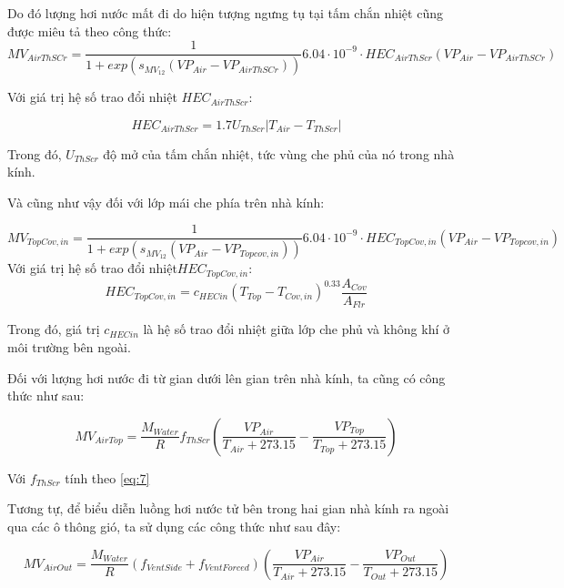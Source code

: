 \documentclass[a4paper]{article}
\begin{document}
Do đó lượng hơi nước mất đi do hiện tượng ngưng tụ tại tấm chắn nhiệt cũng được miêu tả theo công thức:
\begin{equation}\label{AirThScr}
MV_{AirThSCr} =  \frac{1}{1+exp(s_{MV_{12}}(VP_{Air}-VP_{AirThSCr}))}6.04 \cdot 10^{-9}\cdot HEC_{AirThScr} (VP_{Air}-VP_{AirThSCr})
\end{equation}

Với giá trị hệ số trao đổi nhiệt $HEC_{AirThScr}$:

\begin{equation}\label{HECAirThScr}
HEC_{AirThScr} = 1.7U_{ThScr}|T_{Air}-T_{ThScr}|
\end{equation}

Trong đó, $U_{ThScr}$ độ mở của tấm chắn nhiệt, tức vùng che phủ của nó trong nhà kính.

Và cũng như vậy đối với lớp mái che phía trên nhà kính:

\begin{equation}\label{Topcovin}
MV_{TopCov,in} =  \frac{1}{1+exp(s_{MV_{12}}(VP_{Air}-VP_{Topcov,in}))}6.04 \cdot 10^{-9}\cdot HEC_{TopCov,in} (VP_{Air}-VP_{Topcov,in})
\end{equation}
Với giá trị hệ số trao đổi nhiệt$ HEC_{TopCov,in}$:
\begin{equation}\label{TopCov,in}
HEC_{TopCov,in} = c_{HECin}(T_{Top}-T_{Cov,in})^{0.33}\frac{A_{Cov}}{A_{Flr}}
\end{equation}

Trong đó, giá trị $c_{HECin}$ là hệ số trao đổi nhiệt giữa lớp che phủ và không khí ở môi trường bên ngoài.

Đối với lượng hơi nước đi từ gian dưới lên gian trên nhà kính, ta cũng có công thức như sau:

\begin{equation}\label{AirTop}
MV_{AirTop} = \frac{M_{Water}}{R}f_{ThScr} \left( \frac{VP_{Air}}{T_{Air} +273.15}-\frac{VP_{Top}}{T_{Top} +273.15} \right)
\end{equation}

Với $f_{ThScr}$ tính theo \eqref{eq:7}


Tương tự, để biểu diễn luồng hơi nước tử bên trong hai gian nhà kính ra ngoài qua các ô thông gió, ta sử dụng các công thức như sau đây:

\begin{equation}\label{AirOut}
MV_{AirOut} = \frac{M_{Water}}{R}(f_{VentSide} + f_{VentForced})  \left( \frac{VP_{Air}}{T_{Air} +273.15}-\frac{VP_{Out}}{T_{Out} +273.15} \right)
\end{equation}
\end{document}
